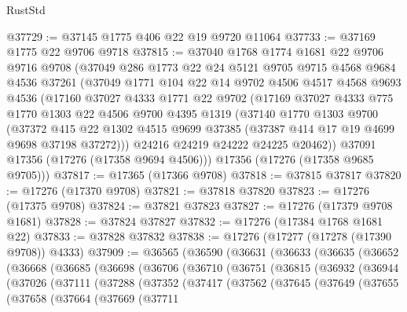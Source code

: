 \begin{lexlean}{RustStd}
\begin{coremodule}
@37729 := @37145 @1775 @406 @22 @19 @9720 @11064
@37733 := @37169 @1775 @22 @9706 @9718
@37815 := @37040
    @1768
    @1774
    @1681
    @22
    @9706
    @9716
    @9708
    (@37049
      @286
      @1773
      @22
      @24
      @5121
      @9705
      @9715
      @4568
      @9684
      @4536
      @37261
      (@37049
        @1771
        @104
        @22
        @14
        @9702
        @4506
        @4517
        @4568
        @9693
        @4536
        (@17160
          @37027
          @4333
          @1771
          @22
          @9702
          (@17169
            @37027
            @4333
            @775
            @1770
            @1303
            @22
            @4506
            @9700
            @4395
            @1319
            (@37140
              @1770
              @1303
              @9700
              (@37372
                @415
                @22
                @1302
                @4515
                @9699
                @37385
                (@37387 @414 @17 @19 @4699 @9698 @37198 @37272)))
            @24216
            @24219
            @24222
            @24225
            @20462))
        @37091
        @17356
        (@17276 (@17358 @9694 @4506)))
      @17356
      (@17276 (@17358 @9685 @9705)))
@37817 := @17365 (@17366 @9708)
@37818 := @37815 @37817
@37820 := @17276 (@17370 @9708)
@37821 := @37818 @37820
@37823 := @17276 (@17375 @9708)
@37824 := @37821 @37823
@37827 := @17276 (@17379 @9708 @1681)
@37828 := @37824 @37827
@37832 := @17276 (@17384 @1768 @1681 @22)
@37833 := @37828 @37832
@37838 := @17276 (@17277 (@17278 (@17390 @9708)) @4333)
@37909 := @36565
    (@36590
      (@36631
        (@36633
          (@36635
            (@36652
              (@36668
                (@36685
                  (@36698
                    (@36706
                      (@36710
                        (@36751
                          (@36815
                            (@36932
                              (@36944
                                (@37026
                                  (@37111
                                    (@37288
                                      (@37352
                                        (@37417
                                          (@37562
                                            (@37645
                                              (@37649
                                                (@37655
                                                  (@37658
                                                    (@37664
                                                      (@37669
                                                        (@37711

\end{coremodule}
\end{lexlean}
